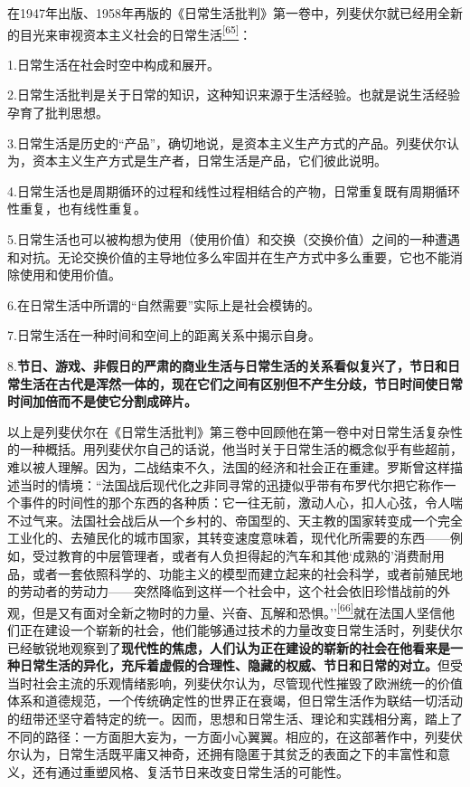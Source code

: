 \documentclass[UTF8, fontset = sourcesans, a4paper, oneside, zihao =
-4, scheme=chinese, no-math, space=true]{ctexbook}
\begin{document}
在1947年出版、1958年再版的《日常生活批判》第一卷中，列斐伏尔就已经用全新的目光来审视资本主义社会的日常生活\protect\hypertarget{part0007_split_004.htmlux5cux23w65}{}{}\protect\hyperlink{part0007_split_004.htmlux5cux23m65}{\textsuperscript{{[}65{]}}}：

1.日常生活在社会时空中构成和展开。

2.日常生活批判是关于日常的知识，这种知识来源于生活经验。也就是说生活经验孕育了批判思想。

3.日常生活是历史的``产品''，确切地说，是资本主义生产方式的产品。列斐伏尔认为，资本主义生产方式是生产者，日常生活是产品，它们彼此说明。

4.日常生活也是周期循环的过程和线性过程相结合的产物，日常重复既有周期循环性重复，也有线性重复。

5.日常生活也可以被构想为使用（使用价值）和交换（交换价值）之间的一种遭遇和对抗。无论交换价值的主导地位多么牢固并在生产方式中多么重要，它也不能消除使用和使用价值。

6.在日常生活中所谓的``自然需要''实际上是社会模铸的。

7.日常生活在一种时间和空间上的距离关系中揭示自身。

8.\textbf{节日、游戏、非假日的严肃的商业生活与日常生活的关系看似复兴了，节日和日常生活在古代是浑然一体的，现在它们之间有区别但不产生分歧，节日时间使日常时间加倍而不是使它分割成碎片。}

以上是列斐伏尔在《日常生活批判》第三卷中回顾他在第一卷中对日常生活复杂性的一种概括。用列斐伏尔自己的话说，他当时关于日常生活的概念似乎有些超前，难以被人理解。因为，二战结束不久，法国的经济和社会正在重建。罗斯曾这样描述当时的情境：``法国战后现代化之非同寻常的迅捷似乎带有布罗代尔把它称作一个事件的时间性的那个东西的各种质：它一往无前，激动人心，扣人心弦，令人喘不过气来。法国社会战后从一个乡村的、帝国型的、天主教的国家转变成一个完全工业化的、去殖民化的城市国家，其转变速度意味着，现代化所需要的东西------例如，受过教育的中层管理者，或者有人负担得起的汽车和其他`成熟的'消费耐用品，或者一套依照科学的、功能主义的模型而建立起来的社会科学，或者前殖民地的劳动者的劳动力------突然降临到这样一个社会中，这个社会依旧珍惜战前的外观，但是又有面对全新之物时的力量、兴奋、瓦解和恐惧。''\protect\hypertarget{part0007_split_004.htmlux5cux23w66}{}{}\protect\hyperlink{part0007_split_004.htmlux5cux23m66}{\textsuperscript{{[}66{]}}}就在法国人坚信他们正在建设一个崭新的社会，他们能够通过技术的力量改变日常生活时，列斐伏尔已经敏锐地观察到了\textbf{现代性的焦虑，人们认为正在建设的崭新的社会在他看来是一种日常生活的异化，充斥着虚假的合理性、隐藏的权威、节日和日常的对立。}但受当时社会主流的乐观情绪影响，列斐伏尔认为，尽管现代性摧毁了欧洲统一的价值体系和道德规范，一个传统确定性的世界正在衰竭，但日常生活作为联结一切活动的纽带还坚守着特定的统一。因而，思想和日常生活、理论和实践相分离，踏上了不同的路径：一方面胆大妄为，一方面小心翼翼。相应的，在这部著作中，列斐伏尔认为，日常生活既平庸又神奇，还拥有隐匿于其贫乏的表面之下的丰富性和意义，还有通过重塑风格、复活节日来改变日常生活的可能性。
\end{document}
